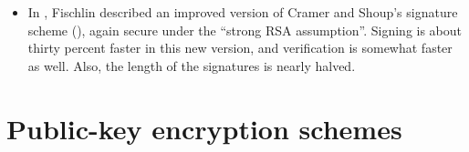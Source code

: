 \begin{itemize}
\item In \cite{fischlin:cramershoup}, Fischlin described an improved version
of Cramer and Shoup's signature scheme (\cite{cramer:signatures2}), again
secure under the ``strong RSA assumption''. Signing is about thirty percent
faster in this new version, and verification is somewhat faster as well.
Also, the length of the signatures is nearly halved. 


\end{itemize}

\section{Public-key encryption schemes}
\label{SEC:EncSchemes}

